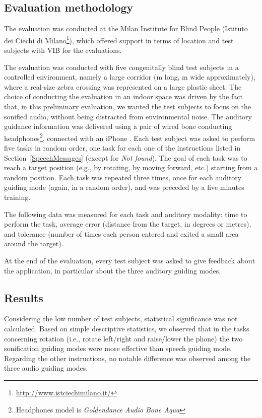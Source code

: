 \documentclass{article}
\begin{document}
\subsection{Evaluation methodology}
\label{sub:prelimMethod}
The evaluation was conducted at the Milan Institute for Blind People (Istituto dei Ciechi di Milano\footnote{\url{http://www.istciechimilano.it/}}), which offered support in terms of location and test subjects with VIB for the evaluations.

The evaluation was conducted with five congenitally blind test subjects in a controlled environment, namely a large corridor (m long, m wide approximately), where a real-size zebra crossing was represented on a large plastic sheet.
The choice of conducting the evaluation in an indoor space was driven by the fact that, in this preliminary evaluation, we wanted the test subjects to focus on the sonified audio, without being distracted from environmental noise.
The auditory guidance information was delivered using a pair of wired bone conducting headphones\footnote{Headphones model is \emph{Goldendance Audio Bone Aqua}}, connected with an iPhone .
Each test subject was asked to perform five tasks in random order, one task for each one of the instructions listed in Section~\ref{SpeechMessages} (except for \emph{Not found}).
The goal of each task was to reach a target position (e.g., by rotating, by moving forward, etc.) starting from a random position.
Each task was repeated three times, once for each auditory guiding mode (again, in a random order), and was preceded by a five minutes training.

The following data was measured for each task and auditory modality: time to perform the task, average error (distance from the target, in degrees or metres), and tolerance (number of times each person entered and exited a small area around the target).

At the end of the evaluation, every test subject was asked to give feedback about the application, in particular about the three auditory guiding modes.

\subsection{Results}
\label{PrelRes}

Considering the low number of test subjects, statistical significance was not calculated. Based on simple descriptive statistics, we observed that in the tasks concerning rotation (i.e., rotate left/right and raise/lower the phone) the two sonification guiding modes were more effective than speech guiding mode.
Regarding the other instructions, no notable difference was observed among the three audio guiding modes.
\end{document}
